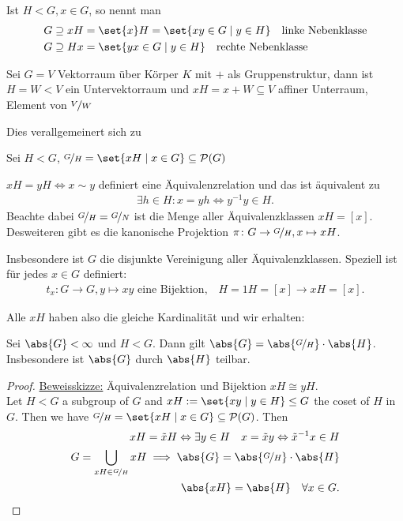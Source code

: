 \begin{definition}
	Ist $H < G, x \in G$, so nennt man
	\begin{align*}
	G \supseteq x H &= \set{x}H = \set{xy \in G \mid y \in H} \quad \text{linke Nebenklasse}\\
	G \supseteq H x &= \set{yx \in G \mid y \in H} \quad \text{rechte Nebenklasse}
	\end{align*}
\end{definition}
\begin{example}
	Sei $G = V$ Vektorraum über Körper $K$ mit $+$ als Gruppenstruktur, dann ist $H = W < V$ ein Untervektorraum und $xH = x + W \subseteq V$ affiner Unterraum, Element von $\lnkset{V}{W}$
\end{example}
Dies verallgemeinert sich zu
\begin{definition}
	Sei $H < G$, $\lnkset{G}{H} = \set{x H \mid x \in G} \subseteq \powerset(G)$
\end{definition}
\begin{remark}
	$xH = yH \Leftrightarrow x \sim y$ definiert eine Äquivalenzrelation und das ist äquivalent zu
	\begin{align*}
		\exists h \in H: x = yh \Leftrightarrow y^{-1}y \in H.
	\end{align*}
	Beachte dabei $\lnkset{G}{H} = \lnkset{G}{N}$ ist die Menge aller Äquivalenzklassen $xH = [x]$. Desweiteren gibt es die kanonische Projektion $\pi\colon G \to \lnkset{G}{H},x \mapsto xH$.
	
	Insbesondere ist $G$ die disjunkte Vereinigung aller Äquivalenzklassen. Speziell ist für jedes $x \in G$ definiert:
	\begin{align*}
		t_x\colon G \to G, y \mapsto xy \text{ eine Bijektion,} \quad H = 1H = [x] \to xH = [x].
	\end{align*}
\end{remark}

Alle $xH$ haben also die gleiche Kardinalität und wir erhalten:
\begin{proposition}
	\label{1_2_9_lagrange}
	Sei $\abs{G} < \infty$ und $H < G$. Dann gilt $\abs{G} = \abs{\lnkset{G}{H}}\cdot \abs{H}$. Insbesondere ist $\abs{G}$ durch $\abs{H}$ teilbar.
\end{proposition}
\begin{proof}
	\ul{Beweisskizze:} Äquivalenzrelation und Bijektion $xH \cong yH$.\\
	Let $H < G$ a subgroup of $G$ and $xH := \set{xy \mid y \in H} \le G$ the coset of $H$ in $G$. Then we have $\lnkset{G}{H} = \set{xH \mid x \in G} \subseteq \powerset(G)$. Then
	\begin{align*}
		xH = \tilde{x}H \Leftrightarrow \exists y \in H \quad x = \tilde{x}y \Leftrightarrow \tilde{x}^{-1}x \in H\\
		G = \bigcup_{xH \in \lnkset{G}{H}} xH \implies \abs{G} = \abs{\lnkset{G}{H}}\cdot \abs{H}\\
		\abs{xH} = \abs{H} \quad \forall x \in G.
	\end{align*}
\end{proof}

